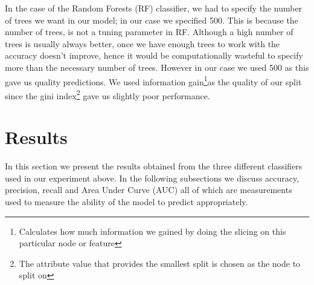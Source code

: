 In the case of the Random Forests (RF) classifier, we had to specify the number of trees we want in our model; in our case we specified 500. This is because the number of trees, is not a tuning parameter in RF. Although a high number of trees is usually always better, once we have enough trees to work with the accuracy doesn't improve, hence it would be computationally wasteful to specify more than the necessary number of trees. However in our case we used 500 as this gave us quality predictions. We used information gain\footnote{Calculates how much information we gained by doing the slicing on this particular node or feature}as the quality of our split since the gini index\footnote{The attribute value that provides the smallest split is chosen as the node to split on} gave us slightly poor performance. 
\section{Results}
In this section we present the results obtained from the three different classifiers used in our experiment above. In the following subsections we discuss accuracy, precision, recall and Area Under Curve (AUC) all of which are measurements used to measure the ability of the model to predict appropriately. 
